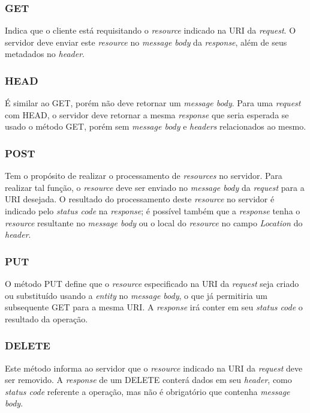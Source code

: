 \subsubsection{GET}
Indica que o cliente está requisitando o \textit{resource} indicado na URI da \textit{request}. O servidor deve enviar este \textit{resource} no \textit{message body} da \textit{response}, além de seus metadados no \textit{header}.

\subsubsection{HEAD}
É similar ao GET, porém não deve retornar um \textit{message body}. Para uma \textit{request} com HEAD, o servidor deve retornar a mesma \textit{response} que seria esperada se usado o método GET, porém sem \textit{message body} e \textit{headers} relacionados ao mesmo.

\subsubsection{POST}
Tem o propósito de realizar o processamento de \textit{resources} no servidor. Para realizar tal função, o \textit{resource} deve ser enviado no \textit{message body} da \textit{request} para a URI desejada. O resultado do processamento deste \textit{resource} no servidor é indicado pelo \textit{status code} na \textit{response}; é possível também que a \textit{response} tenha o \textit{resource} resultante no \textit{message body} ou o local do \textit{resource} no campo \textit{Location} do \textit{header}.

\subsubsection{PUT}
O método PUT define que o \textit{resource} especificado na URI da \textit{request} seja criado ou substituído usando a \textit{entity} no \textit{message body}, o que já permitiria um subsequente GET para a mesma URI. A \textit{response} irá conter em seu \textit{status code} o resultado da operação.

\subsubsection{DELETE}
Este método informa ao servidor que o \textit{resource} indicado na URI da \textit{request} deve ser removido. A \textit{response} de um DELETE conterá dados em seu \textit{header}, como \textit{status code} referente a operação, mas não é obrigatório que contenha \textit{message body}.

